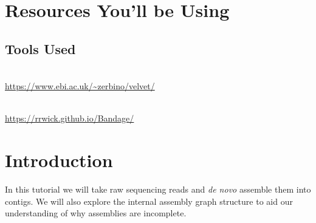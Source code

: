 \section{Resources You'll be Using}

\subsection{Tools Used}
\begin{description}[style=multiline,labelindent=0cm,align=left,leftmargin=0.5cm]
  \item[Velvet]\hfill\\
  	\url{https://www.ebi.ac.uk/~zerbino/velvet/}
  \item[Bandage]\hfill\\
  	\url{https://rrwick.github.io/Bandage/}
\end{description}



\newpage

\section{Introduction}

In this tutorial we will take raw sequencing reads and \textit{de novo} assemble them
into contigs. We will also explore the internal assembly graph structure to
aid our understanding of why assemblies are incomplete.

